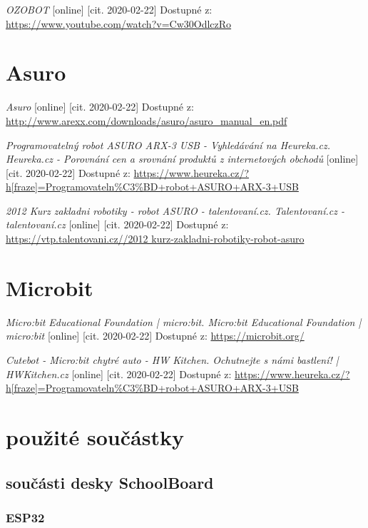 \documentclass{template/socthesis}
\begin{document}
\begin{thebibliography}{1}
	\textit{OZOBOT} [online] [cit. 2020-02-22] Dostupné z:
	\url{https://www.youtube.com/watch?v=Cw30OdlczRo}
	
	\section{Asuro}
	
	\textit{Asuro} [online] [cit. 2020-02-22] Dostupné z:
	\url{ http://www.arexx.com/downloads/asuro/asuro_manual_en.pdf}
	
	\textit{Programovatelný robot ASURO ARX-3 USB - Vyhledávání na Heureka.cz. Heureka.cz - Porovnání cen a srovnání produktů z internetových obchodů } [online] [cit. 2020-02-22] Dostupné z:
	\url{https://www.heureka.cz/?h[fraze]=Programovateln%C3%BD+robot+ASURO+ARX-3+USB}
		
	\textit{2012 Kurz zakladni robotiky - robot ASURO - talentovaní.cz. Talentovaní.cz - talentovaní.cz} [online] [cit. 2020-02-22] Dostupné z:
	\url{https://vtp.talentovani.cz//2012 kurz-zakladni-robotiky-robot-asuro}
	
	\section{Microbit}
	
	\textit{Micro:bit Educational Foundation | micro:bit. Micro:bit Educational Foundation | micro:bit} [online] [cit. 2020-02-22] Dostupné z:
	\url{https://microbit.org/}
	
	\textit{Cutebot - Micro:bit chytré auto - HW Kitchen. Ochutnejte s námi bastlení! | HWKitchen.cz} [online] [cit. 2020-02-22] Dostupné z:
	\url{https://www.heureka.cz/?h[fraze]=Programovateln%C3%BD+robot+ASURO+ARX-3+USB}
	
	\section{použité součástky}
	
	\subsection{součásti desky SchoolBoard}
	
	\subsubsection{ESP32}
	

\end{thebibliography}
\end{document}
